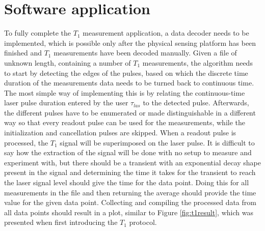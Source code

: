 \section{Software application}
To fully complete the $T_1$ measurement application, a data decoder needs to be implemented, which is possible only after the physical sensing platform has been finished and $T_1$ measurements have been decoded manually. Given a file of unknown length, containing a number of $T_1$ measurements, the algorithm needs to start by detecting the edges of the pulses, based on which the discrete time duration of the measurements data needs to be turned back to continuous time. The most simple way of implementing this is by relating the continuous-time laser pulse duration entered by the user $\tau_{las}$ to the detected pulse. Afterwards, the different pulses have to be enumerated or made distinguishable in a different way so that every readout pulse can be used for the measurements, while the initialization and cancellation pulses are skipped. When a readout pulse is processed, the $T_1$ signal will be superimposed on the laser pulse. It is difficult to say how the extraction of the signal will be done with no setup to measure and experiment with, but there should be a transient with an exponential decay shape present in the signal and determining the time it takes for the transient to reach the laser signal level should give the time for the data point. Doing this for all measurements in the file and then returning the average should provide the time value for the given data point. Collecting and compiling the processed data from all data points should result in a plot, similar to Figure \ref{fig:t1result}, which was presented when first introducing the $T_1$ protocol.

